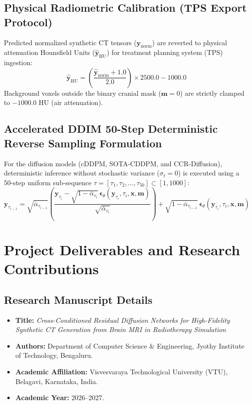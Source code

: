 \section{Physical Radiometric Calibration (TPS Export Protocol)}
Predicted normalized synthetic CT tensors ($\mathbf{\hat{y}}_{\text{norm}}$) are reverted to physical attenuation Hounsfield Units ($\mathbf{\hat{y}}_{\text{HU}}$) for treatment planning system (TPS) ingestion:
\begin{equation}
\mathbf{\hat{y}}_{\text{HU}} = \left( \frac{\mathbf{\hat{y}}_{\text{norm}} + 1.0}{2.0} \right) \times 2500.0 - 1000.0
\label{eq:app_ct_inv}
\end{equation}
Background voxels outside the binary cranial mask ($\mathbf{m} = 0$) are strictly clamped to $-1000.0\text{ HU}$ (air attenuation).

\section{Accelerated DDIM 50-Step Deterministic Reverse Sampling Formulation}
For the diffusion models (cDDPM, SOTA-CDDPM, and CCR-Diffusion), deterministic inference without stochastic variance ($\sigma_t = 0$) is executed using a 50-step uniform sub-sequence $\tau = [\tau_1, \tau_2, \dots, \tau_{50}] \subset [1, 1000]$:
\begin{equation}
\mathbf{y}_{\tau_{i-1}} = \sqrt{\bar{\alpha}_{\tau_{i-1}}} \left( \frac{\mathbf{y}_{\tau_i} - \sqrt{1 - \bar{\alpha}_{\tau_i}} \, \boldsymbol{\epsilon}_\theta(\mathbf{y}_{\tau_i}, \tau_i, \mathbf{x}, \mathbf{m})}{\sqrt{\bar{\alpha}_{\tau_i}}} \right) + \sqrt{1 - \bar{\alpha}_{\tau_{i-1}}} \, \boldsymbol{\epsilon}_\theta(\mathbf{y}_{\tau_i}, \tau_i, \mathbf{x}, \mathbf{m})
\label{eq:app_ddim_step}
\end{equation}

\chapter{Project Deliverables and Research Contributions}
\label{app:deliverables}

\section{Research Manuscript Details}
\begin{itemize}
    \item \textbf{Title:} \textit{Cross-Conditioned Residual Diffusion Networks for High-Fidelity Synthetic CT Generation from Brain MRI in Radiotherapy Simulation}
    \item \textbf{Authors:} Department of Computer Science \& Engineering, Jyothy Institute of Technology, Bengaluru.
    \item \textbf{Academic Affiliation:} Visvesvaraya Technological University (VTU), Belagavi, Karnataka, India.
    \item \textbf{Academic Year:} 2026--2027.
\end{itemize}

